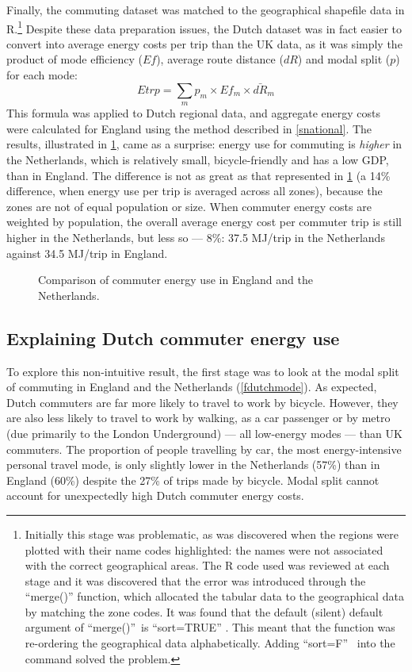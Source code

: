 Finally, the commuting dataset was matched to the geographical shapefile
data in %
R.\footnote{Initially
this stage was problematic, as was discovered when the regions were
plotted with their name codes highlighted: the names were not associated
with the correct geographical areas. The R code used was reviewed at
each stage and it was discovered that the error was introduced through
the ``merge()'' function, which allocated the tabular data to the
geographical data by matching the zone codes. It was found that the
default (silent) default argument of ``merge()''~is ``sort=TRUE'' .
This meant that the function was re-ordering the geographical data
alphabetically. Adding ``sort=F'' ~into the command solved the problem.
}
Despite these data preparation issues, the Dutch dataset
was in fact easier to convert into average energy costs per trip than
the UK data, as it was simply the product of mode efficiency ($Ef$), average
route distance ($dR$) and modal split ($p$) for each mode:
\begin{equation}
 Etrp = \sum_m p_m \times Ef_m \times \bar{dR}_m
\end{equation}
This formula was applied to Dutch regional data, and aggregate energy costs
were calculated for England using the method described in \cref{snational}.
The results, illustrated in \cref{fdutchen}, came as a surprise:
energy use for commuting is \emph{higher} in the Netherlands, which is relatively
small, bicycle-friendly and has a low GDP, than in England. The difference
is not as great as that represented in \cref{fdutchen} (a 14\% difference,
when energy use per trip is averaged across all zones), because the zones
are not of equal population or size. When commuter energy costs are
weighted by population, the overall average energy cost per commuter trip
is still higher in the Netherlands, but less so --- 8\%:
37.5 MJ/trip in the Netherlands against 34.5 MJ/trip in England.

\begin{figure}
 \caption[Comparison of commuter energy use in England and the Netherlands]
 {Comparison of commuter energy use in England and the
Netherlands.} \label{fdutchen}
\end{figure}
\subsection{Explaining Dutch commuter energy use}
To explore this non-intuitive result, the first stage was to look at the modal
split of commuting in England and the Netherlands (\cref{fdutchmode}).
As expected, Dutch commuters are far more likely to travel to work by bicycle.
However, they are also less likely to travel to work by walking, as a car
passenger or by metro (due primarily to the London Underground) --- all low-energy
modes --- than UK commuters. The proportion of people travelling by car,
the most energy-intensive personal travel mode, is  only slightly lower in the
Netherlands (57\%) than in England (60\%) despite the 27\% of trips made by
bicycle. Modal split cannot account for
unexpectedly high Dutch commuter energy costs.

